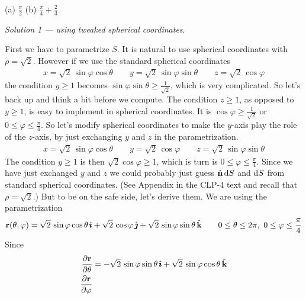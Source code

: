 
\begin{answer} 
(a) $\frac{\pi}{2}$\qquad
(b) $\frac{\pi}{4}+\frac{2}{3}$
\end{answer}

\begin{solution} 

\emph{Solution 1 --- using tweaked spherical coordinates}.

First we have to parametrize $S$. It is natural
to use spherical coordinates with $\rho=\sqrt{2}$. However if we use
the standard spherical coordinates 
\begin{align*}
x=\sqrt{2}\,\sin\varphi\cos\theta \qquad
y=\sqrt{2}\,\sin\varphi\sin\theta \qquad
z=\sqrt{2}\,\cos\varphi
\end{align*}
the condition $y\ge 1$ becomes $\sin\varphi\sin\theta\ge\frac{1}{\sqrt{2}}$, which is very complicated. So let's back up
and think a bit before we compute. The condition $z\ge 1$, as opposed to 
$y\ge 1$, is easy to implement in spherical coordinates. It is
$\cos\varphi\ge \frac{1}{\sqrt{2}}$ or $0\le\varphi\le\frac{\pi}{4}$.
So let's modify spherical coordinates to make the $y$-axis play the 
role of the $z$-axis, by just exchanging $y$ and $z$ in the parametrization.
\begin{align*}
x=\sqrt{2}\,\sin\varphi\cos\theta \qquad
y=\sqrt{2}\,\cos\varphi\qquad
z=\sqrt{2}\,\sin\varphi\sin\theta
\end{align*}
The condition $y\ge 1$ is then $\sqrt{2}\cos\varphi\ge 1$, which is 
turn is $0\le\varphi\le\frac{\pi}{4}$. Since we have just exchanged 
$y$ and $z$ we could probably just guess $\hat{\mathbf{n}}\,\mathrm{d}S$ and $\mathrm{d}S$
from standard spherical coordinates. (See Appendix  in the CLP-4 text and recall that $\rho=\sqrt{2}$.)  But to be on the safe 
side, let's derive them.
We are using the parametrization
\begin{equation*}
\mathbf{r}(\theta, \varphi) = \sqrt{2}\,\sin\varphi\cos\theta\,\hat{\pmb{\imath}}
                +\sqrt{2}\,\cos\varphi\,\hat{\pmb{\jmath}}
                +\sqrt{2}\,\sin\varphi\sin\theta\,\hat{\mathbf{k}}\qquad
0\le\theta\le 2\pi,\ 0\le \varphi\le \frac{\pi}{4}
\end{equation*}
Since
\begin{align*}
\frac{\partial\vr}{\partial\theta}
&= -\sqrt{2}\,\sin\varphi\sin\theta\,\hi 
           +\sqrt{2}\,\sin\varphi\cos\theta\,\hk \\
\frac{\partial\vr}{\partial\varphi}

\end{align*}
\end{solution}
